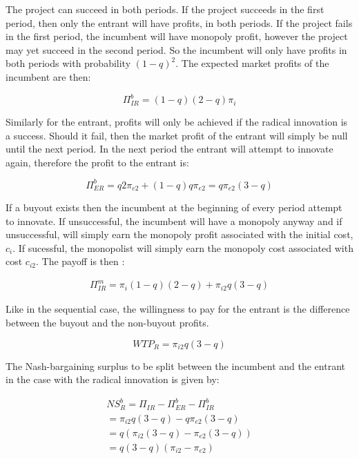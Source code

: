 \documentclass[11pt]{article}
\begin{document}
The project can succeed in both periods. If the project succeeds in the first period, then only the entrant will have profits, in both periods. If the project fails in the first period, the incumbent will have monopoly profit, however the project may yet succeed in the second period. So the incumbent will only have profits in both periods with probability $(1-q)^2$. The expected market profits of the incumbent are then: 

\begin{equation*}
\Pi_{IR}^{b} = (1-q)(2-q) \pi_{i}
\end{equation*}

Similarly for the entrant, profits will only be achieved if the radical innovation is a success. Should it fail, then the market profit of the entrant will simply be null until the next period. In the next period the entrant will attempt to innovate again, therefore the profit to the entrant is:

\begin{equation*}
\Pi_{ER}^{b} =
q 2 \pi_{e2}+(1-q)q\pi_{e2}=q\pi_{e2}(3-q)
\end{equation*}

If a buyout exists then the incumbent at the beginning of every period attempt to innovate. If unsuccessful, the incumbent will have a monopoly anyway and if unsuccessful, will simply earn the monopoly profit associated with the initial cost, $c_i$. If sucessful, the monopolist will simply earn the monopoly cost associated with cost $c_{i2}$. The payoff is then :  

\begin{align*}
\Pi_{IR}^{m} = \pi_{i} (1-q) (2-q)+\pi_{i2} q (3-q)
\end{align*}

Like in the sequential case, the willingness to pay for the entrant is the difference between the buyout and the non-buyout profits. 

\begin{equation*}
WTP_R= \pi_{i2} q (3-q)
\end{equation*} 

The Nash-bargaining surplus to be split between the incumbent and the entrant in the case with the radical innovation is given by: 

\begin{align*} 
NS_R^{b}= \Pi_{IR}-\Pi_{ER}^{b}-\Pi_{IR}^{b}\\
=\pi_{i2} q (3 -q) -q\pi_{e2}(3-q) \\
=q(\pi_{i2} (3-q) - \pi_{e2}(3-q)) \\
=q (3-q)(\pi_{i2} - \pi_{e2})
\end{align*}
\end{document}
